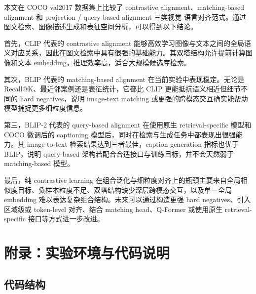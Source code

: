 \documentclass[UTF8,a4paper,10pt]{ctexart}
\begin{document}
本文在 COCO val2017 数据集上比较了 contrastive alignment、matching-based alignment 和 projection / query-based alignment 三类视觉-语言对齐范式。通过图文检索、图像描述生成和表征空间分析，可以得到以下结论。

首先，CLIP 代表的 contrastive alignment 能够高效学习图像与文本之间的全局语义对应关系，因此在图文检索中具有很强的基础能力。其双塔结构允许提前计算图像和文本 embedding，推理效率高，适合大规模候选库检索。

其次，BLIP 代表的 matching-based alignment 在当前实验中表现稳定。无论是 Recall@K、最近邻案例还是表征统计，它都比 CLIP 更能抵抗语义相近但细节不同的 hard negatives，说明 image-text matching 或更强的跨模态交互确实能帮助模型捕捉更多细粒度信息。

第三，BLIP-2 代表的 query-based alignment 在使用原生 retrieval-specific 模型和 COCO 微调后的 captioning 模型后，同时在检索与生成任务中都表现出很强能力。其 image-to-text 检索结果达到三者最佳，caption generation 指标也优于 BLIP，说明 query-based 架构若配合合适接口与训练目标，并不会天然弱于 matching-based 模型。

最后，纯 contrastive learning 在组合泛化与细粒度对齐上的瓶颈主要来自全局相似度目标、负样本粒度不足、双塔结构缺少深层跨模态交互，以及单一全局 embedding 难以表达复杂组合结构。未来可以通过构造更强 hard negatives、引入区域级或 token-level 对齐、结合 matching head、Q-Former 或使用原生 retrieval-specific 接口等方式进一步改进。

\section{附录：实验环境与代码说明}

\subsection{代码结构}
\end{document}
